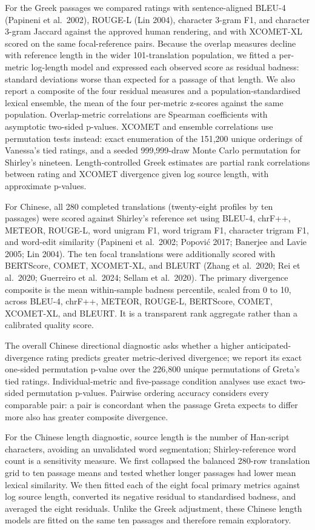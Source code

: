 \documentclass[
  12pt,
]{article}
\begin{document}
For the Greek passages we compared ratings with sentence-aligned BLEU-4
(Papineni et al.~2002), ROUGE-L (Lin 2004), character 3-gram F1, and
character 3-gram Jaccard against the approved human rendering, and with
XCOMET-XL scored on the same focal-reference pairs. Because the overlap
measures decline with reference length in the wider 101-translation
population, we fitted a per-metric log-length model and expressed each
observed score as residual badness: standard deviations worse than
expected for a passage of that length. We also report a composite of the
four residual measures and a population-standardised lexical ensemble,
the mean of the four per-metric z-scores against the same population.
Overlap-metric correlations are Spearman coefficients with asymptotic
two-sided p-values. XCOMET and ensemble correlations use permutation
tests instead: exact enumeration of the 151,200 unique orderings of
Vanessa's tied ratings, and a seeded 999,999-draw Monte Carlo
permutation for Shirley's nineteen. Length-controlled Greek estimates
are partial rank correlations between rating and XCOMET divergence given
log source length, with approximate p-values.

For Chinese, all 280 completed translations (twenty-eight profiles by
ten passages) were scored against Shirley's reference set using BLEU-4,
chrF++, METEOR, ROUGE-L, word unigram F1, word trigram F1, character
trigram F1, and word-edit similarity (Papineni et al.~2002; Popović
2017; Banerjee and Lavie 2005; Lin 2004). The ten focal translations
were additionally scored with BERTScore, COMET, XCOMET-XL, and BLEURT
(Zhang et al.~2020; Rei et al.~2020; Guerreiro et al.~2024; Sellam et
al.~2020). The primary divergence composite is the mean within-sample
badness percentile, scaled from 0 to 10, across BLEU-4, chrF++, METEOR,
ROUGE-L, BERTScore, COMET, XCOMET-XL, and BLEURT. It is a transparent
rank aggregate rather than a calibrated quality score.

The overall Chinese directional diagnostic asks whether a higher
anticipated-divergence rating predicts greater metric-derived
divergence; we report its exact one-sided permutation p-value over the
226,800 unique permutations of Greta's tied ratings. Individual-metric
and five-passage condition analyses use exact two-sided permutation
p-values. Pairwise ordering accuracy considers every comparable pair: a
pair is concordant when the passage Greta expects to differ more also
has greater composite divergence.

For the Chinese length diagnostic, source length is the number of
Han-script characters, avoiding an unvalidated word segmentation;
Shirley-reference word count is a sensitivity measure. We first
collapsed the balanced 280-row translation grid to ten passage means and
tested whether longer passages had lower mean lexical similarity. We
then fitted each of the eight focal primary metrics against log source
length, converted its negative residual to standardised badness, and
averaged the eight residuals. Unlike the Greek adjustment, these Chinese
length models are fitted on the same ten passages and therefore remain
exploratory.
\end{document}
